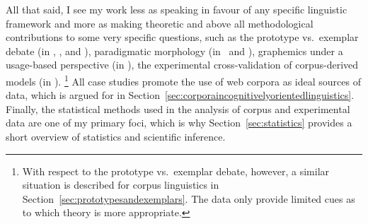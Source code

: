 All that said, I see my work less as speaking in favour of any specific linguistic framework and more as making theoretic and above all methodological contributions to some very specific questions, such as the prototype vs.\ exemplar debate (in \RAWeakN, \RAWeil, and \RAMeasure), paradigmatic morphology (in \RADefArt\ and \RAWeakN), graphemics under a usage-based perspective (in \RAWeil), the experimental cross-validation of corpus-derived models (in \RAMeasure).%
\footnote{With respect to the prototype vs.\ exemplar debate, however, a similar situation is described for corpus linguistics in Section~\ref{sec:prototypesandexemplars}.
The data only provide limited cues as to which theory is more appropriate.}
All case studies promote the use of web corpora as ideal sources of data, which is argued for in Section~\ref{sec:corporaincognitivelyorientedlinguistics}.
Finally, the statistical methods used in the analysis of corpus and experimental data are one of my primary foci, which is why Section~\ref{sec:statistics} provides a short overview of statistics and scientific inference.
